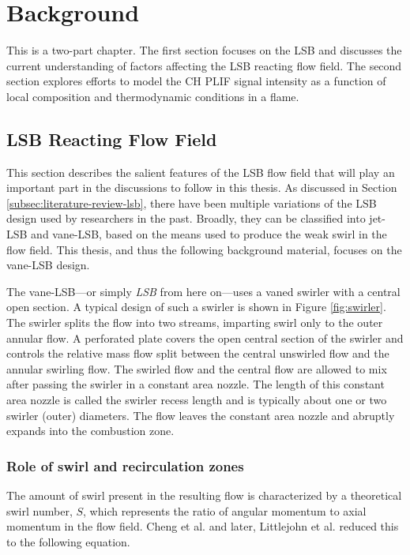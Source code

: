 \chapter{Background}
\label{ch:background}

This is a two-part chapter.
The first section focuses on the LSB and discusses the current understanding of factors affecting the LSB reacting flow field.
The second section explores efforts to model the CH PLIF signal intensity as a function of local composition and thermodynamic conditions in a flame.

\section{LSB Reacting Flow Field}

This section describes the salient features of the LSB flow field that will play an important part in the discussions to follow in this thesis.
As discussed in Section \ref{subsec:literature-review-lsb}, there have been multiple variations of the LSB design used by researchers in the past.
Broadly, they can be classified into jet-LSB and vane-LSB, based on the means used to produce the weak swirl in the flow field.
This thesis, and thus the following background material, focuses on the vane-LSB design.

The vane-LSB---or simply \emph{LSB} from here on---uses a vaned swirler
with a central open section.
A typical design of such a swirler is shown in Figure \ref{fig:swirler}.
The swirler splits the flow into two streams, imparting swirl only to the outer annular flow.
A perforated plate covers the open central section of the swirler and controls the relative mass flow split between the central unswirled flow and the annular swirling flow.
The swirled flow and the central flow are allowed to mix after passing the swirler in a constant area nozzle.
The length of this constant area nozzle is called the swirler recess length and is typically about one or two swirler (outer) diameters.
The flow leaves the constant area nozzle and abruptly expands into the combustion zone.



\subsection{Role of swirl and recirculation zones}

The amount of swirl present in the resulting flow is characterized by a theoretical swirl number, \(S\), which represents the ratio of angular momentum to axial momentum in the flow field.
Cheng et al.\cite{2000-cheng} and later, Littlejohn et al.\cite{2002-littlejohn} reduced this to the following equation.


